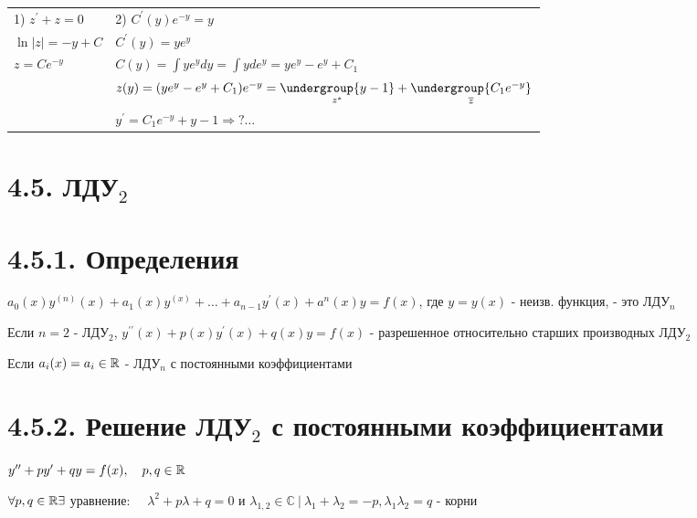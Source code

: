 \documentclass[12pt]{article}
\begin{document}
    \begin{tabular}{p{5cm}p{10cm}}
        1) $z^\prime + z = 0$ & 2) $C^\prime (y) e^{-y} = y$                                                                                              \\

        $\ln|z| = -y + C$     & $C^\prime (y) = ye^{y}$                                                                                                   \\

        $z = Ce^{-y}$         & $C(y) = \int y e^y dy = \int y de^y = ye^y - e^y + C_1$                                                                   \\

        & $z(y) = (ye^y - e^y + C_1)e^{-y} = \underset{z^*}{\undergroup{y - 1}} + \underset{\overline{z}}{\undergroup{C_1 e^{-y}}}$ \\

        & $y^\prime = C_1 e^{-y} + y - 1 \Longrightarrow ? \dots $

    \end{tabular}


    \section{4.5. ЛДУ$_2$}


    \section{4.5.1. Определения}

    \Def $a_0(x) y^{(n)}(x) + a_1(x)y^{(x)} + \dots + a_{n - 1}y^\prime(x) + a^n(x)y = f(x)$, где $y = y(x)$ - неизв. функция, - это ЛДУ$_n$

    \Nota Если $n = 2$ - ЛДУ$_2$, $y^{\prime\prime}(x) + p(x)y^\prime(x) + q(x)y = f(x)$ - разрешенное относительно старших производных ЛДУ$_2$

    \Nota Если $a_i(x) = a_i \in \mathbb{R}$ - ЛДУ$_n$ с постоянными коэффициентами


    \section{4.5.2. Решение ЛДУ$_2$ с постоянными коэффициентами}

    $y^{\prime\prime} + p y^\prime + q y = f(x), \quad p, q \in \mathbb{R}$

    $\forall p, q \in \mathbb{R} \exists $ уравнение: $\quad \lambda^2 + p\lambda + q = 0$ и $\lambda_{1,2} \in \mathbb{C} \ | \ \lambda_1 + \lambda_2 = -p, \lambda_1 \lambda_2 = q$ - корни
\end{document}

